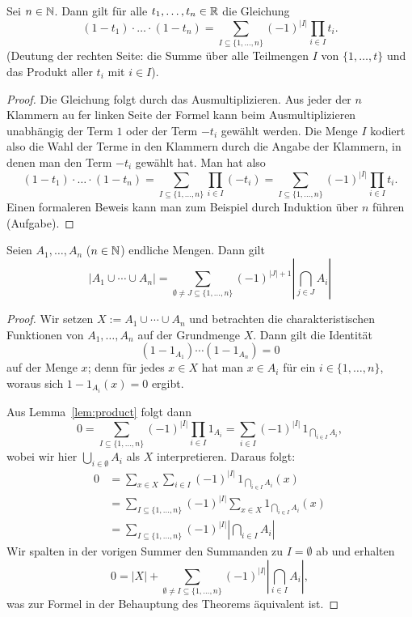 \begin{lem} \label{lem:product} 
	Sei $n \in \mathbb{N}$. Dann gilt für alle $t_1,\ldots,t_n \in \mathbb{R}$ die Gleichung 
	\[
		(1 - t_1) \cdot \ldots \cdot  (1-t_n) = \sum_{I \subseteq \{1,\ldots,n\}} (-1)^{|I|} \prod_{i \in I} t_i.  
	\]
	(Deutung der rechten Seite: die Summe über alle Teilmengen $I$ von $\{1,\ldots,t\}$ und das Produkt aller $t_i$ mit $i \in I$). 
\end{lem} 
\begin{proof} 
	Die Gleichung folgt durch das Ausmultiplizieren. Aus jeder der $n$ Klammern au fer linken Seite der Formel kann  beim Ausmultiplizieren unabhängig der Term $1$ oder der Term $-t_i$ gewählt werden. Die Menge $I$ kodiert also die Wahl der Terme in den Klammern durch die Angabe der Klammern, in denen man den Term $-t_i$ gewählt hat. Man hat also 
	\[
			(1 - t_1) \cdot \ldots \cdot  (1-t_n) = \sum_{I \subseteq \{1,\ldots,n\}}  \prod_{i \in I} (-t_i)  = \sum_{I \subseteq \{1,\ldots,n\}} (-1)^{|I|} \prod_{i \in I} t_i.
	\]
	Einen formaleren Beweis kann man zum Beispiel durch Induktion über $n$ führen (Aufgabe). 
\end{proof} 

\begin{thm} \label{thm:ink:exkl}
	Seien $A_1,\ldots,A_n$ ($n \in \mathbb{N}$) endliche Mengen. Dann gilt 
	\[
		| A_1 \cup \cdots \cup A_n| = \sum_{\emptyset \ne J \subseteq \{1,\ldots,n\}} (-1)^{|J|+1} \left| \bigcap_{j \in J} A_i \right| 
	\]
\end{thm} 
\begin{proof} 
	Wir setzen $X := A_1 \cup \cdots \cup A_n$ und betrachten die charakteristischen Funktionen von $A_1,\ldots,A_n$ auf der Grundmenge $X$. Dann gilt die Identität
	\[
		  (1-1_{A_1} )  \cdots (1 -1_{A_n}) = 0
	\]
	auf der Menge $x$; denn für jedes $x \in X$ hat man $x \in A_i$ für ein $i \in \{1,\ldots,n\}$, woraus sich $1 - 1_{A_i}(x) = 0$ ergibt. 
	
	Aus Lemma~\ref{lem:product} folgt dann 
	\[
		 0 = \sum_{I \subseteq \{1,\ldots,n\}} (-1)^{|I|} \prod_{i \in I} 1_{A_i} = \sum_{i \in I} (-1)^{|I| } \, 1_{\bigcap_{i \in I} A_i},
	\]
	wobei wir hier $\bigcup_{i \in \emptyset} A_i$ als $X$ interpretieren. 
	Daraus folgt: 
	\begin{align*}
		0  & = \sum_{x \in X} \sum_{i \in I} (-1)^{|I| } \, 1_{\bigcap_{i \in I} A_i}(x)
		\\ & = \sum_{I \subseteq \{1,\ldots,n\} } (-1)^{|I| } \sum_{x \in X} 1_{\bigcap_{i \in I} A_i}(x)
		\\ & = \sum_{I \subseteq \{1,\ldots,n\}} (-1)^{|I| } \left| \bigcap_{i \in I} A_i \right|
	\end{align*}
	Wir spalten in der vorigen Summer den Summanden zu $I = \emptyset$ ab und erhalten 
	\[
		0  = |X| + \sum_{\emptyset \ne I \subseteq \{1,\ldots,n\}} (-1)^{|I| } \left| \bigcap_{i \in I} A_i \right|,
	\]
	was zur Formel in der Behauptung des Theorems äquivalent ist. 
\end{proof} 

